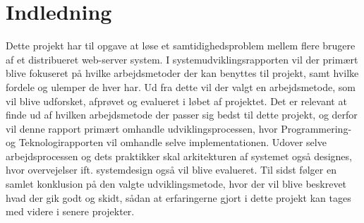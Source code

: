 \chapter{Indledning}\label{ch:indledning}
Dette projekt har til opgave at løse et samtidighedsproblem mellem flere brugere af et distribueret web-server system. I systemudviklingsrapporten vil der primært blive fokuseret på hvilke arbejdsmetoder der kan benyttes til projekt, samt hvilke fordele og ulemper de hver har. Ud fra dette vil der valgt en arbejdsmetode, som vil blive udforsket, afprøvet og evalueret i løbet af projektet. Det er relevant at finde ud af hvilken arbejdsmetode der passer sig bedst til dette projekt, og derfor vil denne rapport primært omhandle udviklingsprocessen, hvor Programmering- og Teknologirapporten vil omhandle selve implementationen. Udover selve arbejdsprocessen og dets praktikker skal arkitekturen af systemet også designes, hvor overvejelser ift. systemdesign også vil blive evalueret. Til sidst følger en samlet konklusion på den valgte udviklingsmetode, hvor der vil blive beskrevet hvad der gik godt og skidt, sådan at erfaringerne gjort i dette projekt kan tages med videre i senere projekter.
